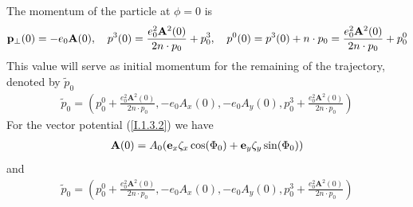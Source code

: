The momentum of the particle at $\phi=0$ is
\begin{align}
  {\bf p}_\perp(0) = -e_0{\bf A}(0), \quad p^{3}(0)=\frac{e_{0}^{2} \mathbf{A}^{2}(0)}{2 n \cdot p_{0}}+p_{0}^{3}, \quad p^{0}(0)=p^{3}(0)+n \cdot p_{0}=\frac{e_{0}^{2} \mathbf{A}^{2}(0)}{2 n \cdot p_{0}}+p_{0}^{0}
\end{align}
This value will serve as initial momentum for the remaining of the trajectory, denoted by $\widetilde p_0$
\begin{align}
  \widetilde p_0=(p_0^0 + \frac{e_{0}^{2} \mathbf{A}^{2}(0)}{2 n \cdot p_{0}},-e_0A_x(0), -e_0A_y(0), p_0^3 + \frac{e_{0}^{2} \mathbf{A}^{2}(0)}{2 n \cdot p_{0}})
\end{align}
For the vector potential (\ref{I.1.3.2}) we have
\begin{align}
  {\bf A}(0) = A_0({\bf e}_x \zeta_x\cos(\Phi_0)+{\bf e}_y \zeta_y\sin(\Phi_0))
\end{align}
and
\begin{align}
  \widetilde p_0=(p_0^0 + \frac{e_{0}^{2} \mathbf{A}^{2}(0)}{2 n \cdot p_{0}},-e_0A_x(0), -e_0A_y(0), p_0^3 + \frac{e_{0}^{2} \mathbf{A}^{2}(0)}{2 n \cdot p_{0}})
\end{align}


